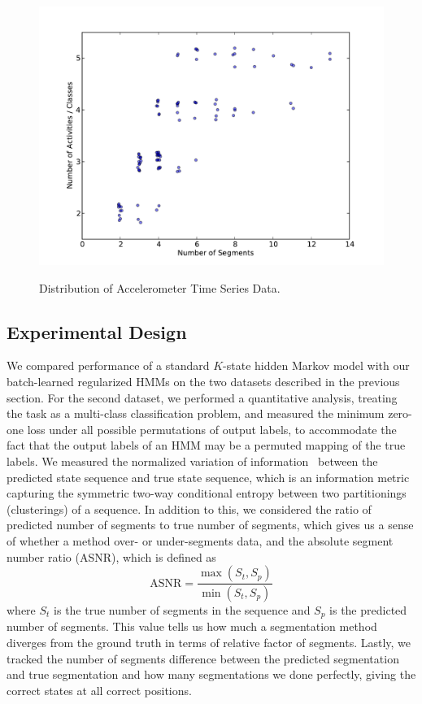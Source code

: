 \documentclass[12pt]{article}
\begin{document}
\begin{figure}[htbp]
    \caption{Distribution of Accelerometer Time Series Data.}
  \centering
    \includegraphics[width=1.\linewidth]{images/distribution_of_dataset_segments.pdf}
    \label{fig:distribution}
\end{figure}

\subsection{Experimental Design}

We compared performance of a standard $K$-state hidden Markov model with our batch-learned regularized HMMs on the two datasets described in the previous section. For the second dataset, we performed a quantitative analysis, treating the task as a multi-class classification problem, and measured the minimum zero-one loss under all possible permutations of output labels, to accommodate the fact that the output labels of an HMM may be a permuted mapping of the true labels. We measured the normalized variation of information~\cite{meila} between the predicted state sequence and true state sequence, which is an information metric capturing the symmetric two-way conditional entropy between two partitionings (clusterings) of a sequence.  In addition to this, we considered the ratio of predicted number of segments to true number of segments, which gives us a sense of whether a method over- or under-segments data, and the absolute segment number ratio (ASNR), which is defined as
\[
    \text{ASNR} = \frac{\max(S_t, S_p)}{\min(S_t, S_p)}
\]
where $S_t$ is the true number of segments in the sequence and $S_p$ is the predicted number of segments. This value tells us how much a segmentation method diverges from the ground truth in terms of relative factor of segments. Lastly, we tracked the number of segments difference between the predicted segmentation and true segmentation and how many segmentations we done perfectly, giving the correct states at all correct positions.
\end{document}
